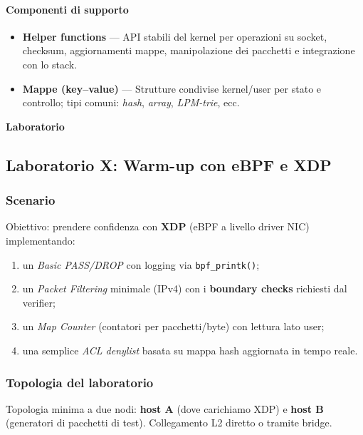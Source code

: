 \paragraph{Componenti di supporto}
\begin{itemize}
  \item \textbf{Helper functions} — API stabili del kernel per operazioni su socket, checksum, aggiornamenti mappe, manipolazione dei pacchetti e integrazione con lo stack.
  \item \textbf{Mappe (key–value)} — Strutture condivise kernel/user per stato e controllo; tipi comuni: \emph{hash}, \emph{array}, \emph{LPM-trie}, ecc.
\end{itemize}

\newpage
\maketitle
{\LARGE \textbf{Laboratorio}} \\[0.5em]
\subsection{Laboratorio X: Warm-up con eBPF e XDP}

\subsubsection{Scenario}
Obiettivo: prendere confidenza con \textbf{XDP} (eBPF a livello driver NIC) implementando:
\begin{enumerate}
  \item un \emph{Basic PASS/DROP} con logging via \texttt{bpf\_printk()};
  \item un \emph{Packet Filtering} minimale (IPv4) con i \textbf{boundary checks} richiesti dal verifier;
  \item un \emph{Map Counter} (contatori per pacchetti/byte) con lettura lato user;
  \item una semplice \emph{ACL denylist} basata su mappa hash aggiornata in tempo reale.
\end{enumerate}

\subsubsection{Topologia del laboratorio}
Topologia minima a due nodi: \textbf{host A} (dove carichiamo XDP) e \textbf{host B} (generatori di pacchetti di test). Collegamento L2 diretto o tramite bridge.

